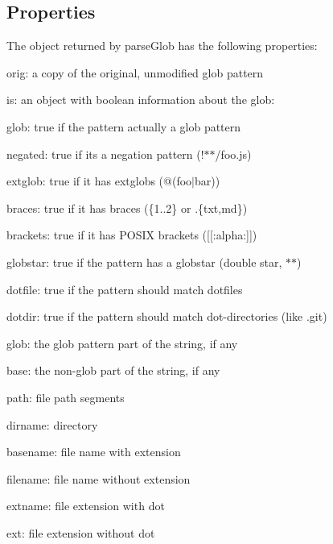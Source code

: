\subsection*{Properties}

The object returned by parse\+Glob has the following properties\+:


\begin{DoxyItemize}
\item {\ttfamily orig}\+: a copy of the original, unmodified glob pattern
\item {\ttfamily is}\+: an object with boolean information about the glob\+:
\begin{DoxyItemize}
\item {\ttfamily glob}\+: true if the pattern actually a glob pattern
\item {\ttfamily negated}\+: true if it\textquotesingle{}s a negation pattern ({\ttfamily !$\ast$$\ast$/foo.js})
\item {\ttfamily extglob}\+: true if it has extglobs ({\ttfamily @(foo$\vert$bar)})
\item {\ttfamily braces}\+: true if it has braces ({\ttfamily \{1..2\}} or {\ttfamily .\{txt,md\}})
\item {\ttfamily brackets}\+: true if it has P\+O\+S\+IX brackets ({\ttfamily \mbox{[}\mbox{[}\+:alpha\+:\mbox{]}\mbox{]}})
\item {\ttfamily globstar}\+: true if the pattern has a globstar (double star, {\ttfamily $\ast$$\ast$})
\item {\ttfamily dotfile}\+: true if the pattern should match dotfiles
\item {\ttfamily dotdir}\+: true if the pattern should match dot-\/directories (like {\ttfamily .git})
\end{DoxyItemize}
\item {\ttfamily glob}\+: the glob pattern part of the string, if any
\item {\ttfamily base}\+: the non-\/glob part of the string, if any
\item {\ttfamily path}\+: file path segments
\begin{DoxyItemize}
\item {\ttfamily dirname}\+: directory
\item {\ttfamily basename}\+: file name with extension
\item {\ttfamily filename}\+: file name without extension
\item {\ttfamily extname}\+: file extension with dot
\item {\ttfamily ext}\+: file extension without dot
\end{DoxyItemize}
\end{DoxyItemize}

